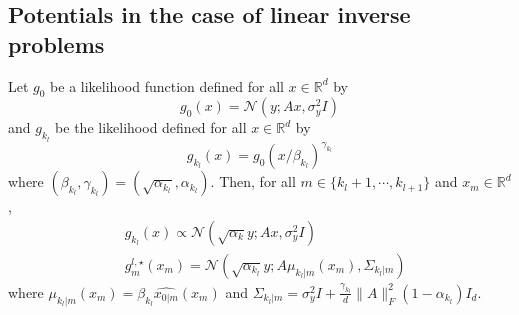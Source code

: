 \documentclass[12pt]{article}
\begin{document}
\subsection{Potentials in the case of linear inverse problems}

\begin{assumption}
    Let $g_0$ be a likelihood function defined for all $x \in \mathbb{R}^d$ by
    $$g_0(x) = \mathcal{N}(y;Ax, \sigma_y^2 I)$$
    and $g_{k_l}$ be the likelihood defined for all $x \in \mathbb{R}^d$ by
    $$g_{k_l}(x) = g_0(x/\beta_{k_l})^{\gamma_{k_l}}$$
    where $(\beta_{k_l},\gamma_{k_l}) = (\sqrt{\alpha_{k_l}}, \alpha_{k_l})$.
    Then, for all $m \in \{k_l+1, \cdots, k_{l+1}\}$ and $x_m \in \mathbb{R}^d$,
    \begin{align}
    &g_{k_l}(x) \propto \mathcal{N}\left(\sqrt{\alpha_k}y; Ax, \sigma_y^2 I \right) \\
    &g_m^{l,\star} (x_m) = \mathcal{N}\left(\sqrt{\alpha_{k_l}}y; A \mu_{k_l|m}(x_m), \Sigma_{k_l|m} \right)
    \end{align}
    where $\mu_{k_l|m}(x_m) = \beta_{k_l} \hat{x_{0|m}}(x_m)$ and
    $\Sigma_{k_l|m} = \sigma_y^2 I + \frac{\gamma_{k_l}}{d} \| A \|_F^2 (1 - \alpha_{k_l}) I_d$.
\end{assumption}
\end{document}

